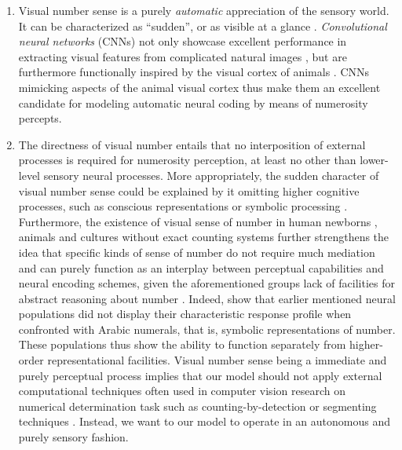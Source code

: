 \documentclass[twocolumn]{article}
\begin{document}
\begin{enumerate}
\def\labelenumi{\arabic{enumi}.}
\item
  Visual number sense is a purely \emph{automatic} appreciation of the
  sensory world. It can be characterized as ``sudden'', or as visible at
  a glance
  \citetext{\citealp[p.~57]{dehaene2011number}; \citealp{zhang2016salient}}.
  \emph{Convolutional neural networks} (CNNs) not only showcase
  excellent performance in extracting visual features from complicated
  natural images
  \citetext{\citealp{GoogleDeepMind}; \citealp{krizhevsky2012imagenet}; \citealp[for
  visual number sense and CNNs see][]{zhang2016salient}}, but are
  furthermore functionally inspired by the visual cortex of animals
  \citep[specifically cats, see][]{lecun1995convolutional}. CNNs
  mimicking aspects of the animal visual cortex thus make them an
  excellent candidate for modeling automatic neural coding by means of
  numerosity percepts.
\item
  The directness of visual number entails that no interposition of
  external processes is required for numerosity perception, at least no
  other than lower-level sensory neural processes. More appropriately,
  the sudden character of visual number sense could be explained by it
  omitting higher cognitive processes, such as conscious representations
  \citep[p.~58 indeed points to types of visual number sense being
  pre-attentive]{dehaene2011number} or symbolic processing \citep[visual
  numerosity percepts are understood
  non-verbally,][]{nieder2016neuronal}. Furthermore, the existence of
  visual sense of number in human newborns \citep[chap. 1]{lakoff},
  animals \citep{animalsnumericalcognition} and cultures without exact
  counting systems
  \citetext{\citealp[p.~261]{dehaene2011number}; \citealp{franka2008number}}
  further strengthens the idea that specific kinds of sense of number do
  not require much mediation and can purely function as an interplay
  between perceptual capabilities and neural encoding schemes, given the
  aforementioned groups lack of facilities for abstract reasoning about
  number \citetext{\citealp[see][p.~626]{Everett2005}; \citealp[chap. 3,
  for a discussion on how cultural facilities such as fixed symbols and
  linguistic practices can facilitate the existence of discrete number
  in humans]{lakoff}}. Indeed, \citet{harvey2013topographic} show that
  earlier mentioned neural populations did not display their
  characteristic response profile when confronted with Arabic numerals,
  that is, symbolic representations of number. These populations thus
  show the ability to function separately from higher-order
  representational facilities. Visual number sense being a immediate and
  purely perceptual process implies that our model should not apply
  external computational techniques often used in computer vision
  research on numerical determination task such as counting-by-detection
  \citep[which requires both arithmetic and iterative attention to all
  group members, see][]{zhang2016salient, detection2016unconstrained} or
  segmenting techniques \citep[e.g.][]{chattopadhyay2016counting}.
  Instead, we want to our model to operate in an autonomous and purely
  sensory fashion.
\end{enumerate}
\end{document}
